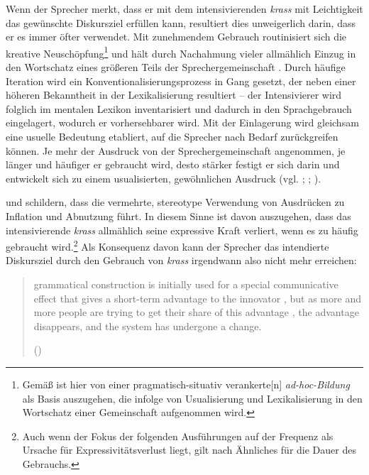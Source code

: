 Wenn der Sprecher merkt, dass er mit dem intensivierenden \textit{krass} mit Leichtigkeit das gewünschte Diskursziel erfüllen kann, resultiert dies unweigerlich darin, dass er es immer öfter verwendet. Mit zunehmendem Gebrauch routinisiert sich die kreative Neuschöpfung\footnote{Gemäß \citet[75]{Koch.1996} ist hier von einer \glqq{}pragmatisch-situativ verankerte[n] \textit{ad-hoc-Bildung}\grqq{} als Basis auszugehen, die infolge von Usualisierung und Lexikalisierung in den Wortschatz einer Gemeinschaft aufgenommen wird.} und hält durch Nachahmung vieler allmählich Einzug in den Wortschatz eines größeren Teils der Sprechergemeinschaft \citep[vgl.][171f.]{Androutsopoulos.1999}. Durch häufige Iteration wird ein Konventionalisierungsprozess in Gang gesetzt, der neben einer höheren Bekanntheit in der Lexikalisierung resultiert -- der Intensivierer wird folglich im mentalen Lexikon inventarisiert und dadurch in den Sprachgebrauch eingelagert, wodurch er vorhersehbarer wird. Mit der Einlagerung wird gleichsam eine usuelle Bedeutung etabliert, auf die Sprecher nach Bedarf zurückgreifen können. Je mehr der Ausdruck von der Sprechergemeinschaft angenommen, je länger und häufiger er gebraucht wird, desto stärker festigt er sich darin und entwickelt sich zu einem usualisierten, gewöhnlichen Ausdruck (vgl. \citealt[59]{Tobler.1868}; \citealt[1055]{Haspelmath.1999}; {\citealt[3]{Heine.2002a}}).

\citet[2]{Hauschild.1899} und \citet[1055]{Haspelmath.1999} schildern, dass die vermehrte, stereotype Verwendung von Ausdrücken zu Inflation und Abnutzung führt. In diesem Sinne ist davon auszugehen, dass das intensivierende \textit{krass} allmählich seine expressive Kraft verliert, wenn es zu häufig gebraucht wird.\footnote{Auch wenn der Fokus der folgenden Ausführungen auf der Frequenz als Ursache für Expressivitätsverlust liegt, gilt nach \citet[59]{Tobler.1868} Ähnliches für die Dauer des Gebrauchs.} Als Konsequenz davon kann der Sprecher das intendierte Diskursziel durch den Gebrauch von \textit{krass} irgendwann also nicht mehr erreichen:

\begin{quotation} \noindent [A] grammatical construction is initially used for a special communicative effect that gives a short-term advantage to the innovator \textelp{}, but as more and more people are trying to get their share of this advantage \textelp{}, the advantage disappears, and the system has undergone a change. \par \hfill (\citealt[1061]{Haspelmath.1999})  \end{quotation}

